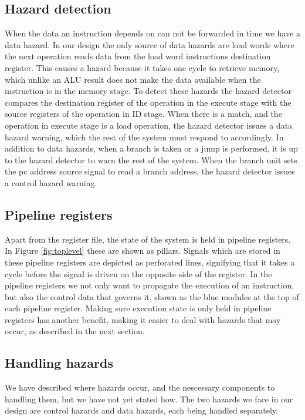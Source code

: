 \subsection{Hazard detection}
When the data an instruction depends on can not be forwarded in time we have a data hazard. In our design the only source of data hazards are load words where the next operation reads data from the load word instructions destination register. 
This causes a hazard because it takes one cycle to retrieve memory, which unlike an ALU result does not make the data available when the instruction is in the memory stage. 
To detect these hazards the hazard detector compares the destination register of the operation in the execute stage with the source registers of the operation in ID stage.
When there is a match, and the operation in execute stage is a load operation, the hazard detector issues a data hazard warning, which the rest of the system must respond to accordingly.
In addition to data hazards, when a branch is taken or a jump is performed, it is up to the hazard detector to warn the rest of the system.
When the branch unit sets the pc address source signal to read a branch address, the hazard detector issues a control hazard warning.

\subsection{Pipeline registers}
Apart from the register file, the state of the system is held in pipeline registers. In Figure \ref{fig:toplevel} these are shown as pillars.
Signals which are stored in these pipeline registers are depicted as perforated lines, signifying that it takes a cycle before the signal is driven on the opposite side of the register.
In the pipeline registers we not only want to propagate the execution of an instruction, but also the control data that governs it, shown as the blue modules at the top of each pipeline register.
Making sure execution state is only held in pipeline registers has another benefit, making it easier to deal with hazards that may occur, as described in the next section.

\subsection{Handling hazards}
We have described where hazards occur, and the nescessary components to handling them, but we have not yet stated how.
The two hazards we face in our design are control hazards and data hazards, each being handled separately.

